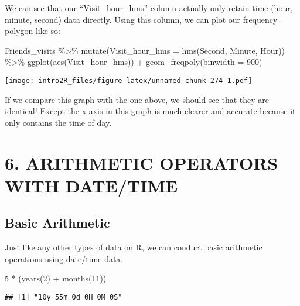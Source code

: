 \documentclass[
]{book}
\newenvironment{Shaded}{\begin{snugshade}}{\end{snugshade}}
\newcommand{\AttributeTok}[1]{\textcolor[rgb]{0.77,0.63,0.00}{#1}}
\newcommand{\DecValTok}[1]{\textcolor[rgb]{0.00,0.00,0.81}{#1}}
\newcommand{\FunctionTok}[1]{\textcolor[rgb]{0.00,0.00,0.00}{#1}}
\newcommand{\NormalTok}[1]{#1}
\newcommand{\SpecialCharTok}[1]{\textcolor[rgb]{0.00,0.00,0.00}{#1}}
\begin{document}
We can see that our ``Visit\_hour\_hms'' column actually only retain time (hour, minute, second) data directly. Using this column, we can plot our frequency polygon like so:

\begin{Shaded}
\begin{Highlighting}[]
\NormalTok{ Friends\_visits }\SpecialCharTok{\%\textgreater{}\%} 
    \FunctionTok{mutate}\NormalTok{(}\AttributeTok{Visit\_hour\_hms =} \FunctionTok{hms}\NormalTok{(Second, Minute, Hour)) }\SpecialCharTok{\%\textgreater{}\%}
    \FunctionTok{ggplot}\NormalTok{(}\FunctionTok{aes}\NormalTok{(Visit\_hour\_hms)) }\SpecialCharTok{+}
    \FunctionTok{geom\_freqpoly}\NormalTok{(}\AttributeTok{binwidth =} \DecValTok{900}\NormalTok{)}
\end{Highlighting}
\end{Shaded}

\texttt{[image: intro2R\_files/figure-latex/unnamed-chunk-274-1.pdf]}

If we compare this graph with the one above, we should see that they are identical! Except the x-axis in this graph is much clearer and accurate because it only contains the time of day.

\hypertarget{arithmetic-operators-with-datetime}{%
\section{6. ARITHMETIC OPERATORS WITH DATE/TIME}\label{arithmetic-operators-with-datetime}}

\hypertarget{basic-arithmetic}{%
\subsection{Basic Arithmetic}\label{basic-arithmetic}}

Just like any other types of data on R, we can conduct basic arithmetic operations using date/time data.

\begin{Shaded}
\begin{Highlighting}[]
\DecValTok{5} \SpecialCharTok{*}\NormalTok{ (}\FunctionTok{years}\NormalTok{(}\DecValTok{2}\NormalTok{) }\SpecialCharTok{+} \FunctionTok{months}\NormalTok{(}\DecValTok{11}\NormalTok{))}
\end{Highlighting}
\end{Shaded}

\begin{verbatim}
## [1] "10y 55m 0d 0H 0M 0S"
\end{verbatim}
\end{document}
